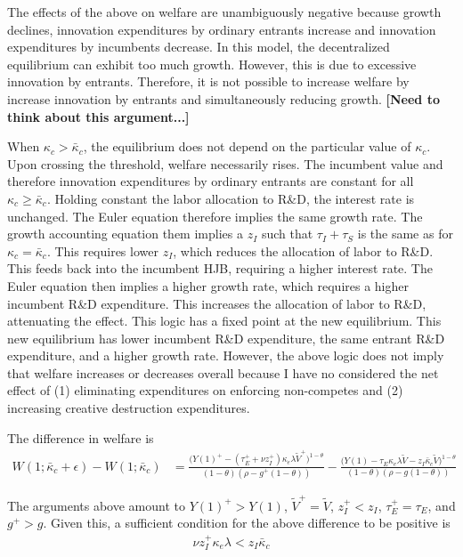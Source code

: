 \documentclass[12pt,english]{article}
\theoremstyle{remark}
\begin{document}
The effects of the above on welfare are unambiguously negative because growth declines, innovation expenditures by ordinary entrants increase and innovation expenditures by incumbents decrease. In this model, the decentralized equilibrium can exhibit too much growth. However, this is due to excessive innovation by entrants. Therefore, it is not possible to increase welfare by increase innovation by entrants and simultaneously reducing growth. \textbf{[Need to think about this argument...]}

When $\kappa_{c} > \bar{\kappa}_c$, the equilibrium does not depend on the particular value of $\kappa_{c}$. Upon crossing the threshold, welfare necessarily rises. The incumbent value and therefore innovation expenditures by ordinary entrants are constant for all $\kappa_{c} \ge \bar{\kappa}_c$. Holding constant the labor allocation to R\&D, the interest rate is unchanged. The Euler equation therefore implies the same growth rate. The growth accounting equation them implies a $z_I$ such that $\tau_I + \tau_S$ is the same as for $\kappa_{c} = \bar{\kappa}_c$. This requires lower $z_I$, which reduces the allocation of labor to R\&D. This feeds back into the incumbent HJB, requiring a higher interest rate. The Euler equation then implies a higher growth rate, which requires a higher incumbent R\&D expenditure. This increases the allocation of labor to R\&D, attenuating the effect. This logic has a fixed point at the new equilibrium. This new equilibrium has lower incumbent R\&D expenditure, the same entrant R\&D expenditure, and a higher growth rate. However, the above logic does not imply that welfare increases or decreases overall because I have no considered the net effect of (1) eliminating expenditures on enforcing non-competes and (2) increasing creative destruction expenditures.

The difference in welfare is
\begin{align}
	W(1;\bar{\kappa}_c + \epsilon) - W(1;\bar{\kappa}_c) &= \frac{\big(Y(1)^+ - (\tau_E^+ + \nu z_I^+) \kappa_{e} \lambda \tilde{V}^+\big)^{1-\theta}}{(1-\theta)(\rho - g^+(1-\theta))} - \frac{\big(Y(1) - \tau_E \kappa_{e} \lambda \tilde{V} - z_I \bar{\kappa}_c \tilde{V}\big)^{1-\theta}}{(1-\theta)(\rho - g(1-\theta))}
\end{align}

The arguments above amount to $Y(1)^+ > Y(1)$, $\tilde{V}^+ = \tilde{V}$, $z_I^+ < z_I$, $\tau_E^+ = \tau_E$, and $g^+ > g$. Given this, a sufficient condition for the above difference to be positive is 
\begin{align*}
\nu z_I^+ \kappa_e \lambda <  z_I \bar{\kappa}_c
\end{align*}
\end{document}
